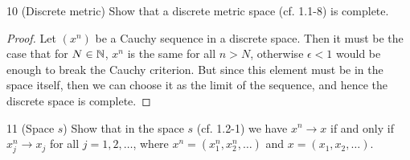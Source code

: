 \begin{exercise}{10 (Discrete metric)}
Show that a discrete metric space (cf. 1.1-8) is complete.
\end{exercise}
\begin{proof}
Let $(x^n)$ be a Cauchy sequence in a discrete space. Then it must be the case that for $N\in\mathbb{N}$, $x^n$ is the same for all $n>N$, otherwise $\epsilon<1$ would be enough to break the Cauchy criterion. But since this element must be in the space itself, then we can choose it as the limit of the sequence, and hence the discrete space is complete.
\end{proof}

\begin{exercise}{11 (Space $s$)}
Show that in the space $s$ (cf. 1.2-1) we have $x^n\to x$ if and only if $x^n_j\to x_j$ for all $j=1,2,\dots$, where $x^n=(x^n_1, x^n_2,\dots)$ and $x=(x_1, x_2,\dots)$.
\end{exercise}
